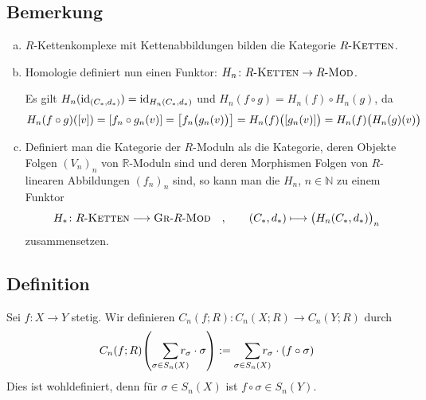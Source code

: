 \subsection[Bemerkung: Homologie definiert einen Funktor]{Bemerkung} %
\label{sub:63}
\begin{enumerate}[a)]
	\item $R$-Kettenkomplexe mit Kettenabbildungen bilden die Kategorie $R\text{-}\textsc{Ketten}$.
	\item Homologie definiert nun einen Funktor: $H_n \colon R\text{-}\textsc{Ketten} \to R\text{-}\MOD$.
	
	Es gilt $H_n(\id_{(C_*,d_*)}) = \id_{H_n(C_*,d_*)}$ und $H_n(f \circ g) = H_n(f) \circ H_n(g)$, da
	\[
		H_n(f \circ g) \enbrace*{[v]} = \benbrace*{f_n \circ g_n(v)} = \benbrace*{f_n \enbrace[\big]{g_n(v)} } = H_n(f) \enbrace[\big]{\benbrace*{g_n(v)}} = H_n(f) \enbrace[\big]{H_n(g)(v)}     
	\]
	\item Definiert man die Kategorie der  $R$-Moduln als die Kategorie, deren Objekte Folgen $(V_n)_n$ von $\mathds{R}$-Moduln sind und deren
	Morphismen Folgen von $R$-linearen Abbildungen $(f_n)_{n}$ sind, so kann man die $H_n$, $n \in \mathds{N}$ zu einem Funktor
	\[
		H_* \colon R\text{-}\textsc{Ketten} \longrightarrow \textsc{Gr}\text{-}R\text{-}\MOD \quad , \qquad (C_*,d_*) \longmapsto \enbrace[\big]{H_n(C_*,d_*)}_n 
	\]
	zusammensetzen.
\end{enumerate}

\subsection[Definition: Induzierte Abbildung auf Kettenkomplexen]{Definition} %
\label{sub:64}
Sei $f : X \to Y$ stetig. Wir definieren $C_n(f;R) \colon C_n(X;R) \to C_n(Y;R)$ durch
\[
	C_n(f;R) \enbrace*{\smashoperator[r]{\sum_{\sigma \in S_n(X)}} r_\sigma \cdot  \sigma} := \smashoperator[r]{\sum_{\sigma \in S_n(X)}} r_\sigma \cdot \enbrace*{f \circ \sigma} 
\]
Dies ist wohldefiniert, denn für $\sigma \in S_n(X)$ ist $f \circ \sigma \in S_n(Y)$. 

